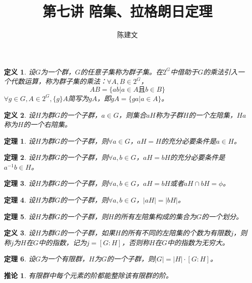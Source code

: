 \documentclass{article}
\newtheorem{Def}{定义}
\newtheorem{Thm}{定理}
\newtheorem{Cor}{推论}
\begin{document}
\begin{CJK*}{UTF8}{gbsn}
  \title{第七讲 陪集、拉格朗日定理}
  \author{陈建文}
  \maketitle
  \begin{Def}
    设$G$为一个群，$G$的任意子集称为群子集。在$2^G$中借助于$G$的乘法引入一个代数运算，称为群子集的乘法：$\forall A,B\in 2^G$，
    \[AB=\{ab|a\in A \text{且} b\in B\}\]
    $\forall g\in G,A\in 2^G,\{g\}A$简写为$gA$，即$gA=\{ga|a\in A\}$。
  \end{Def}

\begin{Def}
  设$H$为群$G$的一个子群，$a\in G$，则集合$aH$称为子群$H$的一个左陪集，$Ha$称为$H$的一个右陪集。
\end{Def}

\begin{Thm}
  设$H$为群$G$的一个子群，则$\forall a\in G$，$aH=H$的充分必要条件是$a\in H$。
\end{Thm}
  
\begin{Thm}
  设$H$为群$G$的一个子群，则$\forall a,b\in G$，$aH=bH$的充分必要条件是$a^{-1}b\in H$。
\end{Thm}

\begin{Thm}
  设$H$为群$G$的一个子群，则$\forall a,b\in G$，$aH=bH$或者$aH\cap bH=\phi$。
\end{Thm}

\begin{Thm}
  设$H$为群$G$的一个子群，则$\forall a,b\in G$，$|aH|=|bH|$。
\end{Thm}

\begin{Thm}
  设$H$为群$G$的一个子群，则$H$的所有左陪集构成的集合为$G$的一个划分。
\end{Thm}

\begin{Def}
  设$H$为群$G$的一个子群，如果$H$的所有不同的左陪集的个数为有限数$j$，则称$j$为$H$在$G$中的指数，记为$j=[G:H]$，否则称$H$在$G$中的指数为无穷大。
\end{Def}

\begin{Thm}
 设$G$为一个有限群，$H$为$G$的一个子群，则$|G|=|H|\cdot [G:H]$。 
\end{Thm}

\begin{Cor}
有限群中每个元素的阶都能整除该有限群的阶。
\end{Cor}


\end{CJK*}
\end{document}

